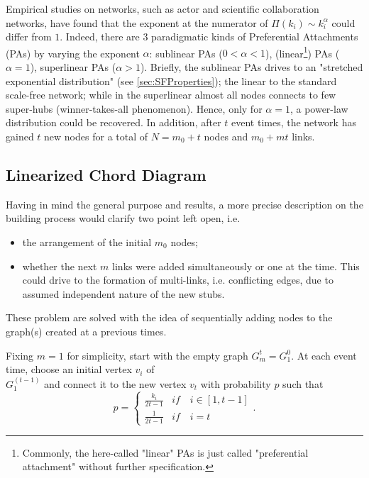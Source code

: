 \documentclass[a4paper,10pt, oneside]{book} %
\theoremstyle{definition}
\begin{document}
Empirical studies on networks, such as actor and scientific collaboration networks, have found that the exponent at the numerator of $\Pi(k_i) \sim k_i^\alpha$ could differ from $1$.
Indeed, there are $3$ paradigmatic kinds of Preferential Attachments (PAs) by varying the exponent $\alpha$: sublinear PAs ($0<\alpha<1$), (linear\footnote{Commonly, the here-called "linear" PAs is just called "preferential attachment" without further specification.}) PAs ($\alpha = 1$), superlinear PAs ($\alpha>1$). Briefly, the sublinear PAs drives to an "stretched exponential distribution" (see \autoref{sec:SFProperties}); the linear to the standard scale-free network; while in the superlinear almost all nodes connects to few super-hubs (winner-takes-all phenomenon).
Hence, only for $\alpha = 1$, a power-law distribution could be recovered. In addition, after $t$ event times, the network has gained $t$ new nodes for a total of $N = m_0 + t$ nodes and $m_0 + mt$ links.

\newpage
\subsection{Linearized Chord Diagram}
Having in mind the general purpose and results, a more precise description on the building process would clarify two point left open, i.e. 
\begin{itemize}
	\item the arrangement of the initial $m_0$ nodes;
	\item whether the next $m$ links were added simultaneously or one at the time. This could drive to the formation of multi-links, i.e. conflicting edges, due to assumed independent nature of the new stubs. 
\end{itemize}

These problem are solved with the idea of sequentially adding nodes to the graph(s) created at a previous times.

Fixing $m=1$ for simplicity, start with the empty graph $G_{m}^t = G_1^0$.
At each event time, choose an initial vertex $v_i$ of \\ $G_1^{(t-1)}$ and connect it to the new vertex $v_t$ with probability $p$ such that
\begin{equation}
	p =
	\begin{cases}
		\frac{k_i}{2t-1} & if \quad i \in [1,t-1] \\
		\frac{1}{2t-1} & if \quad i = t
	\end{cases}
	.
\end{equation}
\end{document}
